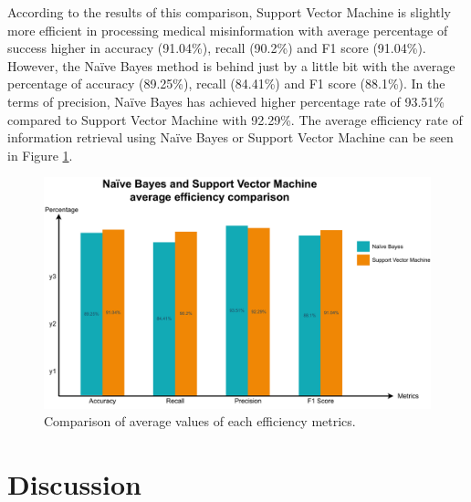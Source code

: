 \documentclass[11pt ,english,a4paper]{article}
\begin{document}
According to the results of this comparison, Support Vector Machine is slightly more efficient in processing medical misinformation with average percentage of success higher in accuracy (91.04\%), recall (90.2\%) and F1 score (91.04\%). However, the Naïve Bayes method is behind just by a little bit with the average percentage of accuracy (89.25\%), recall (84.41\%) and F1 score (88.1\%). In the terms of precision, Naïve Bayes has achieved higher percentage rate of 93.51\% compared to Support Vector Machine with 92.29\%. The average efficiency rate of information retrieval using Naïve Bayes or Support Vector Machine can be seen in Figure \ref{f:average}. 

\begin{figure}[H]
\centering
\includegraphics[scale=0.5]{average.pdf}
\caption{\centering Comparison of average values of each efficiency metrics.}
\label{f:average}
\end{figure}

\section{Discussion}
\end{document}
